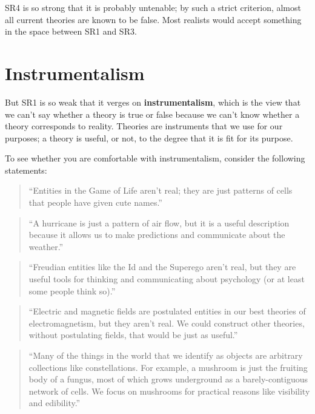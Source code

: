 \documentclass[12pt]{book}
\theoremstyle{exercise}
\begin{document}
SR4 is so strong that it is probably untenable; by such a strict
criterion, almost all current theories are known to be false.
Most realists would accept something in the space
between SR1 and SR3.


\section{Instrumentalism}

But SR1 is so weak that it verges on {\bf instrumentalism}, which is
the view that we can't say whether a theory is true or false because
we can't know whether a theory corresponds to reality.  Theories are
instruments that we use for our purposes; a theory is useful, or not,
to the degree that it is fit for its purpose.


To see whether you are comfortable with instrumentalism, consider
the following statements:

\begin{quote}
``Entities in the Game of Life aren't real; they are just patterns of
  cells that people have given cute names.''
\end{quote}

\begin{quote}
``A hurricane is just a pattern of air flow, but it is a useful
  description because it allows us to make predictions and communicate
  about the weather.''
\end{quote}


\begin{quote}
``Freudian entities like the Id and the Superego aren't real, but they
  are useful tools for thinking and communicating about psychology (or
  at least some people think so).''
\end{quote}


\begin{quote}
``Electric and magnetic fields are postulated entities in our best
  theories of electromagnetism, but they aren't real.  We could
  construct other theories, without postulating fields, that would be
  just as useful.''
\end{quote}


\begin{quote}
``Many of the things in the world that we identify as objects are
  arbitrary collections like constellations.  For example, a mushroom
  is just the fruiting body of a fungus, most of which grows
  underground as a barely-contiguous network of cells.  We focus
  on mushrooms for practical reasons like visibility and edibility.''
\end{quote}
\end{document}
